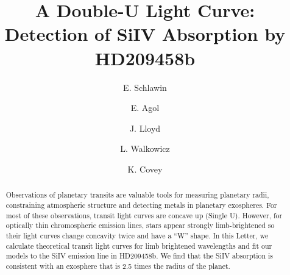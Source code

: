 \documentclass[manuscript]{aastex}
\begin{document}

\title{A Double-U Light Curve:\\
Detection of SiIV Absorption by HD209458b}


\author{E. Schlawin} 
\author{E. Agol}
\author{J. Lloyd}
\author{L. Walkowicz}
\author{K. Covey}







\begin{abstract}
Observations of planetary transits are valuable tools for measuring planetary radii, constraining atmospheric structure and detecting metals in planetary exospheres. For most of these observations, transit light curves are concave up (Single U). However, for optically thin chromospheric emission lines, stars appear strongly limb-brightened so their light curves change concavity twice and have a ``W'' shape. In this Letter, we calculate theoretical transit light curves for limb brightened wavelengths and fit our models to the SiIV emission line in HD209458b. We find that the SiIV absorption is consistent with an exosphere that is 2.5 times the radius of the planet.
\end{abstract}
\end{document}
